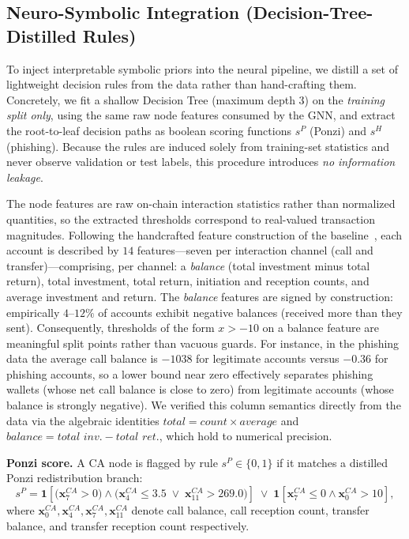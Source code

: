 \documentclass[conference]{IEEEtran}
\begin{document}
\subsection{Neuro-Symbolic Integration (Decision-Tree-Distilled Rules)}
\label{sec:expert}

To inject interpretable symbolic priors into the neural pipeline, we
distill a set of lightweight decision rules from the data rather than
hand-crafting them. Concretely, we fit a shallow Decision Tree
(maximum depth $3$) on the \emph{training split only}, using the same
raw node features consumed by the GNN, and extract the root-to-leaf
decision paths as boolean scoring functions $s^P$ (Ponzi) and $s^H$
(phishing). Because the rules are induced solely from training-set
statistics and never observe validation or test labels, this procedure
introduces \emph{no information leakage}.

The node features are raw on-chain interaction statistics rather than
normalized quantities, so the extracted thresholds correspond to
real-valued transaction magnitudes. Following the handcrafted feature
construction of the baseline~\cite{paper_baseline_2408.00641}, each
account is described by $14$ features---seven per interaction channel
(call and transfer)---comprising, per channel: a \emph{balance}
(total investment minus total return), total investment, total return,
initiation and reception counts, and average investment and return.
The \emph{balance} features are signed by construction: empirically
$4$--$12\%$ of accounts exhibit negative balances (received more than
they sent). Consequently, thresholds of the form $x > {-}10$ on a
balance feature are meaningful split points rather than vacuous guards.
For instance, in the phishing data the average call balance is $-1038$
for legitimate accounts versus $-0.36$ for phishing accounts, so a
lower bound near zero effectively separates phishing wallets (whose net
call balance is close to zero) from legitimate accounts (whose balance
is strongly negative). We verified this column semantics directly from
the data via the algebraic identities $\textit{total}=\textit{count}\times\textit{average}$
and $\textit{balance}=\textit{total inv.}-\textit{total ret.}$, which
hold to numerical precision.

\medskip\noindent\textbf{Ponzi score.}
A CA node is flagged by rule $s^P\!\in\!\{0,1\}$ if it
matches a distilled Ponzi redistribution branch:
\begin{equation}
  s^P = \mathbf{1}\!\left[
    \bigl(\mathbf{x}^{CA}_{7} > 0\bigr)
    \wedge
    \bigl(\mathbf{x}^{CA}_{4} \le 3.5 \;\vee\; \mathbf{x}^{CA}_{11} > 269.0\bigr)
  \right]
  \;\vee\;
  \mathbf{1}\!\left[
    \mathbf{x}^{CA}_{7}\le 0 \wedge \mathbf{x}^{CA}_{0} > 10
  \right],
\end{equation}
where $\mathbf{x}^{CA}_{0},\mathbf{x}^{CA}_{4},\mathbf{x}^{CA}_{7},
\mathbf{x}^{CA}_{11}$ denote call balance, call reception count,
transfer balance, and transfer reception count respectively.
\end{document}
